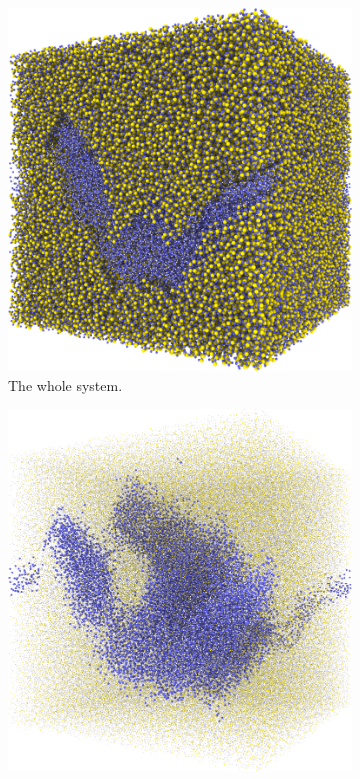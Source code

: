 %
\begin{figure}[!p]%
    \centering%
    \setlength{\myfigwidth}{0.49\textwidth}%
%
    \begin{subfigure}[t]{\myfigwidth}%
        \centering%
        \includegraphics[width=\textwidth]{images/systems/trimmed-rough_fracture03_06}%
        \caption{The whole system.}%
    \end{subfigure}%
    \hfill%
    \begin{subfigure}[t]{\myfigwidth}%
        \centering%
        \includegraphics[width=\textwidth]{images/systems/trimmed-rough_fracture03_05}%

\end{subfigure}
\end{figure}

